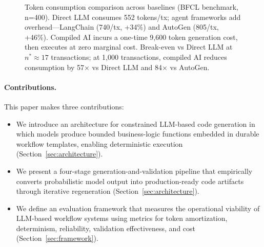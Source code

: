 \documentclass[11pt]{article}
\begin{document}
\begin{figure}[ht]
\caption{Token consumption comparison across baselines (BFCL benchmark, n=400). Direct LLM consumes 552 tokens/tx; agent frameworks add overhead---LangChain (740/tx, +34\%) and AutoGen (805/tx, +46\%). Compiled AI incurs a one-time 9,600 token generation cost, then executes at zero marginal cost. Break-even vs Direct LLM at $n^*\approx17$ transactions; at 1,000 transactions, compiled AI reduces consumption by 57$\times$ vs Direct LLM and 84$\times$ vs AutoGen.}
\label{fig:economics}
\end{figure}

\paragraph{Contributions.}
This paper makes three contributions:
\begin{itemize}
    \item We introduce an architecture for constrained LLM-based code generation in which models produce bounded business-logic functions embedded in durable workflow templates, enabling deterministic execution (Section~\ref{sec:architecture}).
    \item We present a four-stage generation-and-validation pipeline that empirically converts probabilistic model output into production-ready code artifacts through iterative regeneration (Section~\ref{sec:architecture}).
    \item We define an evaluation framework that measures the operational viability of LLM-based workflow systems using metrics for token amortization, determinism, reliability, validation effectiveness, and cost (Section~\ref{sec:framework}).
\end{itemize}
\end{document}
